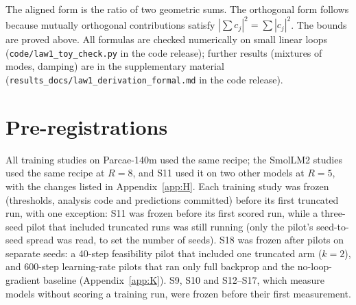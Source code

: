 \documentclass[10pt]{article}
\begin{document}
The aligned form is the ratio of two geometric sums. The orthogonal form follows because mutually orthogonal contributions satisfy $|\sum c_j|^2 = \sum |c_j|^2$. The bounds are proved above. All formulas are checked numerically on small linear loops (\texttt{code/law1\_toy\_check.py} in the code release); further results (mixtures of modes, damping) are in the supplementary material (\texttt{results\_docs/law1\_derivation\_formal.md} in the code release).

\section{Pre-registrations}\label{app:B}

All training studies on Parcae-140m used the same recipe; the SmolLM2 studies used the same recipe at $R = 8$, and S11 used it on two other models at $R = 5$, with the changes listed in Appendix~\ref{app:H}. Each training study was frozen (thresholds, analysis code and predictions committed) before its first truncated run, with one exception: S11 was frozen before its first scored run, while a three-seed pilot that included truncated runs was still running (only the pilot's seed-to-seed spread was read, to set the number of seeds). S18 was frozen after pilots on separate seeds: a 40-step feasibility pilot that included one truncated arm ($k = 2$), and 600-step learning-rate pilots that ran only full backprop and the no-loop-gradient baseline (Appendix~\ref{app:K}). S9, S10 and S12--S17, which measure models without scoring a training run, were frozen before their first measurement.
\end{document}
